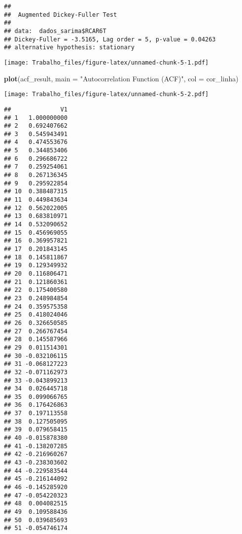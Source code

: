 \documentclass[
]{article}
\newenvironment{Shaded}{\begin{snugshade}}{\end{snugshade}}
\newcommand{\AttributeTok}[1]{\textcolor[rgb]{0.13,0.29,0.53}{#1}}
\newcommand{\DecValTok}[1]{\textcolor[rgb]{0.00,0.00,0.81}{#1}}
\newcommand{\FunctionTok}[1]{\textcolor[rgb]{0.13,0.29,0.53}{\textbf{#1}}}
\newcommand{\NormalTok}[1]{#1}
\newcommand{\OtherTok}[1]{\textcolor[rgb]{0.56,0.35,0.01}{#1}}
\newcommand{\SpecialCharTok}[1]{\textcolor[rgb]{0.81,0.36,0.00}{\textbf{#1}}}
\newcommand{\StringTok}[1]{\textcolor[rgb]{0.31,0.60,0.02}{#1}}
\begin{document}
\begin{verbatim}
## 
##  Augmented Dickey-Fuller Test
## 
## data:  dados_sarima$RCAR6T
## Dickey-Fuller = -3.5165, Lag order = 5, p-value = 0.04263
## alternative hypothesis: stationary
\end{verbatim}

\begin{Shaded}
\end{Shaded}

\texttt{[image: Trabalho\_files/figure-latex/unnamed-chunk-5-1.pdf]}

\begin{Shaded}
\begin{Highlighting}[]
\FunctionTok{plot}\NormalTok{(acf\_result, }\AttributeTok{main =} \StringTok{"Autocorrelation Function (ACF)"}\NormalTok{, }\AttributeTok{col =}\NormalTok{ cor\_linha)}
\end{Highlighting}
\end{Shaded}

\texttt{[image: Trabalho\_files/figure-latex/unnamed-chunk-5-2.pdf]}

\begin{Shaded}
\end{Shaded}

\begin{verbatim}
##              V1
## 1   1.000000000
## 2   0.692407662
## 3   0.545943491
## 4   0.474553676
## 5   0.344853406
## 6   0.296686722
## 7   0.259254061
## 8   0.267136345
## 9   0.295922854
## 10  0.388487315
## 11  0.449843634
## 12  0.562022005
## 13  0.683810971
## 14  0.532090652
## 15  0.456969055
## 16  0.369957821
## 17  0.201843145
## 18  0.145811867
## 19  0.129349932
## 20  0.116806471
## 21  0.121860361
## 22  0.175400580
## 23  0.248984854
## 24  0.359575358
## 25  0.418024046
## 26  0.326650585
## 27  0.266767454
## 28  0.145587966
## 29  0.011514301
## 30 -0.032106115
## 31 -0.068127223
## 32 -0.071162973
## 33 -0.043899213
## 34  0.026445718
## 35  0.099066765
## 36  0.176426863
## 37  0.197113558
## 38  0.127505095
## 39  0.079658415
## 40 -0.015878380
## 41 -0.138207285
## 42 -0.216960267
## 43 -0.238303602
## 44 -0.229583544
## 45 -0.216144092
## 46 -0.145285920
## 47 -0.054220323
## 48  0.004082515
## 49  0.109588436
## 50  0.039685693
## 51 -0.054746174
\end{verbatim}
\end{document}
